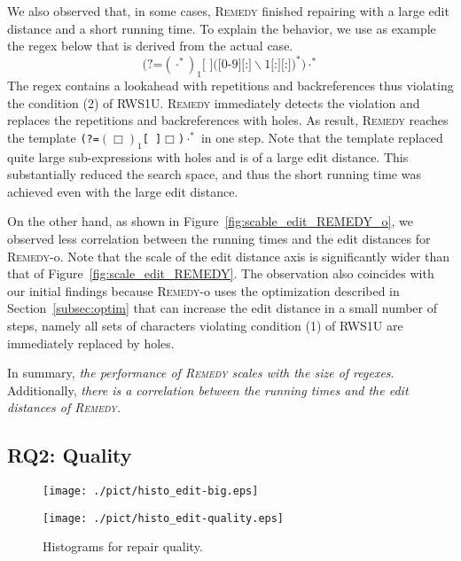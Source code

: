 \documentclass[conference]{IEEEtran}
\newcommand{\tool}{\textsc{Remedy}}
\newcommand{\hole}{\Box}
\newcommand{\any}{\cdot}
\newcommand{\ltp}{RWS1U}
\newcommand{\tchanged}[2]{#2}
\newcommand{\texcomment}[1]{}
\begin{document}
{We also observed that, in \tchanged{one case}{some cases}, \tool{} finished repairing with a large edit distance and a short running time.  To explain the behavior, we use as example the regex below that is derived from the actual case.
\[
\texttt{(?=$(\any^*)_1$[ ]$([0$-$9][$:$]\backslash1[$:$][$:$])^*$)$\any^*$}
\]
The regex contains a lookahead with repetitions and backreferences thus violating the condition (2) of \ltp{}.  \tool{} immediately detects the violation and replaces the repetitions and backreferences with holes.  As result, \tool{} reaches the template \texttt{(?=$(\hole{})_1$[ ]$\hole{}$)$\any^*$} in one step.  Note that the template replaced quite large sub-expressions with holes and is of a large edit distance.  This substantially reduced the search space, and thus the short running time was achieved even with the large edit distance.


On the other hand, as shown in Figure~\ref{fig:scable_edit_REMEDY_o}, we observed less correlation between the running times and the edit distances for \tool{}-o.  Note that the scale of the edit distance axis is significantly wider than that of Figure~\ref{fig:scale_edit_REMEDY}.  The observation also coincides with our initial findings because \tool{}-o uses the optimization described in Section~\ref{subsec:optim} that can increase the edit distance in a small number of steps\tchanged{.}{, namely all sets of characters violating condition (1) of \ltp{} are immediately replaced by holes.}
\texcomment{
\tchanged{}{ For example, the points at edit distance $\sim$130 in Figure \ref{fig:scable_edit_REMEDY_o} are caused by the optimization regarding the condition (1) of \ltp{}. }
}

In summary, {\em the performance of \tool{} scales with the size of regexes}. Additionally, {\em there is a correlation between the running times and the edit distances of \tool{}. }
}








\subsection{RQ2: Quality}
\label{subsec:rq2}
\begin{figure}[t]
 \begin{minipage}[b]{0.49\linewidth}
  \centering
\texttt{[image: ./pict/histo\_edit-big.eps]}
    \label{fig:histoedit}   
 \end{minipage}
 \begin{minipage}[b]{0.49\linewidth}
  \centering
\texttt{[image: ./pict/histo\_edit-quality.eps]}
\label{fig:histoeditquality}
 \end{minipage} 
 \caption{Histograms for repair quality.}\label{fig:histograms_of_edits}
\end{figure}
\end{document}
